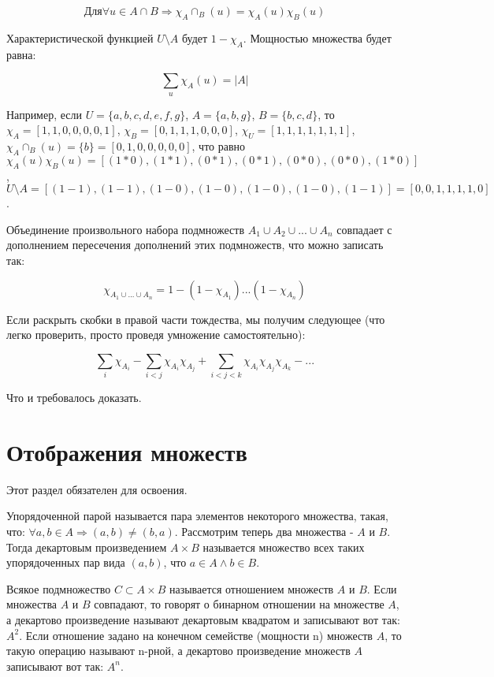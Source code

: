 \documentclass[a4paper]{book}
\begin{document}
\begin{equation}
Для \forall u \in A\cap B \Rightarrow \chi_A\cap_B(u) = \chi_A(u)\chi_B(u)
\end{equation}

Характеристической функцией $U\setminus A$ будет $1 - \chi_A$. Мощностью множества будет равна:  

\begin{equation}
\sum_{u} \chi_A(u) = |A|
\end{equation}


Например, если $U = \{a,b,c,d,e,f,g\}$, $A = \{a,b,g\}$, $B = \{b,c,d\}$, то $\chi_A = [1, 1, 0, 0, 0, 0, 1]$, $\chi_B = [0, 1, 1, 1, 0, 0, 0]$, $\chi_U = [1, 1, 1, 1, 1, 1, 1]$, $\chi_A\cap_B(u) = \{b\} = [0, 1, 0, 0, 0, 0, 0]$, что равно $\chi_A(u)\chi_B(u) = [(1\ast 0), (1\ast 1), (0\ast 1), (0\ast 1), (0\ast 0), (0\ast 0), (1\ast 0)]$,  $U\setminus A = [(1-1), (1-1), (1-0), (1-0), (1-0), (1-0), (1-1)] = [0, 0, 1, 1, 1, 1, 0]$.

Объединение произвольного набора подмножеств $A_1 \cup A_2 \cup ... \cup A_n$ совпадает с дополнением пересечения дополнений этих подмножеств, что можно записать так: 

\begin{equation}
\chi_{A_1\cup...\cup A_n} = 1 - (1 - \chi_{A_1})...(1 - \chi_{A_n})
\end{equation}

Если раскрыть скобки в правой части тождества, мы получим следующее (что легко проверить, просто проведя умножение самостоятельно): 

\begin{equation}
\sum_{i}\chi_{A_i} - \sum_{i<j}\chi_{A_i}\chi_{A_j} + \sum_{i<j<k}\chi_{A_i}\chi_{A_j}\chi_{A_k} - ...
\end{equation}

Что и требовалось доказать. 

\section{Отображения множеств}
Этот раздел обязателен для освоения. 

Упорядоченной парой называется пара элементов некоторого множества, такая, что: $\forall a,b\in A \Rightarrow (a,b) \neq (b,a)$. Рассмотрим теперь два множества - $A$ и $B$. Тогда декартовым произведением $A\times B$ называется множество всех таких упорядоченных пар вида $(a,b)$, что $a \in A \wedge b \in B$. 

Всякое подмножество $C \subset A\times B$ называется отношением множеств $A$ и $B$. Если множества $A$ и $B$ совпадают, то говорят о бинарном отношении на множестве $A$, а декартово произведение называют декартовым квадратом и записывают вот так: $A^2$. Если отношение задано на конечном семействе (мощности n) множеств $A$, то такую операцию называют n-рной, а декартово произведение множеств $A$ записывают вот так: $A^n$. 
\end{document}
